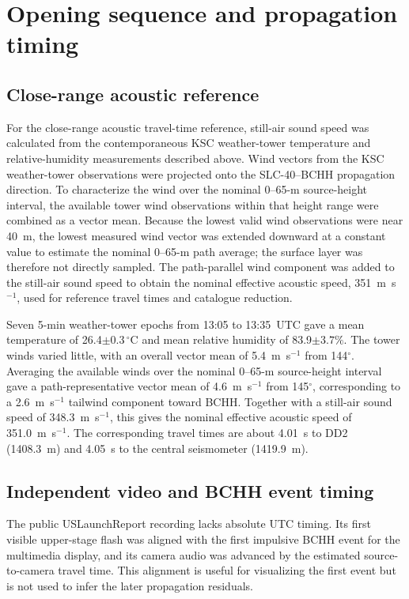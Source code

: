 \documentclass[]{seismica}
\begin{document}
\section{Opening sequence and propagation timing}
\label{sec:opening_timing}

\subsection{Close-range acoustic reference}

For the close-range acoustic travel-time reference, still-air sound speed was
calculated from the contemporaneous KSC weather-tower temperature and
relative-humidity measurements described above. Wind vectors from the KSC weather-tower observations were
projected onto the SLC-40--BCHH propagation direction. To characterize the wind
over the nominal 0--65-m source-height interval, the available tower wind
observations within that height range were combined as a vector mean. Because
the lowest valid wind observations were near 40~m, the lowest measured wind
vector was extended downward at a constant value to estimate the nominal
0--65-m path average; the surface layer was therefore not directly sampled.
The path-parallel wind component was added to the still-air sound speed to
obtain the nominal effective acoustic speed, 351~m~s$^{-1}$, used for
reference travel times and catalogue reduction.

Seven 5-min weather-tower epochs from 13:05 to 13:35~UTC gave a mean
temperature of 26.4$\pm0.3\,^{\circ}$C and mean relative humidity of
83.9$\pm3.7\%$. The tower winds varied little, with an overall vector mean of
5.4~m~s$^{-1}$ from 144$^\circ$. Averaging the available winds over the
nominal 0--65-m source-height interval gave a path-representative vector mean
of 4.6~m~s$^{-1}$ from 145$^\circ$, corresponding to a 2.6~m~s$^{-1}$
tailwind component toward BCHH. Together with a still-air sound speed of
348.3~m~s$^{-1}$, this gives the nominal effective acoustic speed of
351.0~m~s$^{-1}$. The corresponding travel times are about 4.01~s to DD2
(1408.3~m) and 4.05~s to the central seismometer (1419.9~m).

\subsection{Independent video and BCHH event timing}

The public USLaunchReport recording lacks absolute UTC timing. Its first visible
upper-stage flash was aligned with the first impulsive BCHH event for the
multimedia display, and its camera audio was advanced by the estimated
source-to-camera travel time. This alignment is useful for visualizing the
first event but is not used to infer the later propagation residuals.
\end{document}
